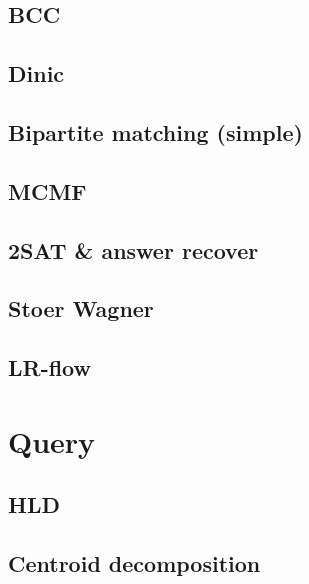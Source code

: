 \documentclass[10pt,landscape,a4paper,twocolumn]{article}
\begin{document}
\subsection{BCC}


\subsection{Dinic}


\subsection{Bipartite matching (simple)}


\subsection{MCMF}


\subsection{2SAT \& answer recover}


\subsection{Stoer Wagner}


\subsection{LR-flow}



%
\section{Query}
\subsection{HLD}


\subsection{Centroid decomposition}

\end{document}
